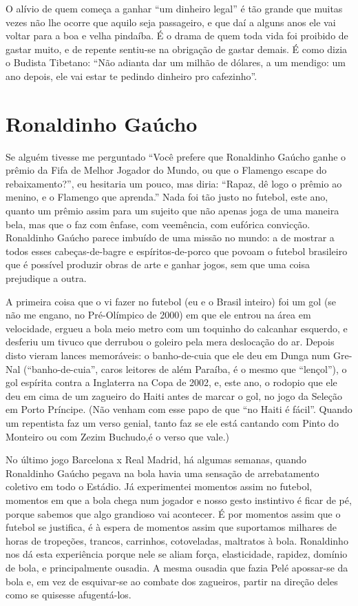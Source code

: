 O alívio de quem começa a ganhar “um dinheiro legal” é tão grande que
muitas vezes não lhe ocorre que aquilo seja passageiro, e que daí a
alguns anos ele vai voltar para a boa e velha pindaíba. É o drama de
quem toda vida foi proibido de gastar muito, e de repente sentiu-se
na obrigação de gastar demais. É como dizia o Budista Tibetano: “Não
adianta dar um milhão de dólares, a um mendigo: um ano depois, ele
vai estar te pedindo dinheiro pro cafezinho”.

\chapter{Ronaldinho Gaúcho}

Se alguém tivesse me perguntado “Você prefere que Ronaldinho Gaúcho
ganhe o prêmio da Fifa de Melhor Jogador do Mundo, ou que o Flamengo
escape do rebaixamento?”, eu hesitaria um pouco, mas diria: “Rapaz,
dê logo o prêmio ao menino, e o Flamengo que aprenda.”  Nada foi tão
justo no futebol, este ano, quanto um prêmio assim para um sujeito
que não apenas joga de uma maneira bela, mas que o faz com ênfase,
com veemência, com eufórica convicção. Ronaldinho Gaúcho parece
imbuído de uma missão no mundo: a de mostrar a todos esses
cabeças-de-bagre e espíritos-de-porco que povoam o futebol brasileiro
que é possível produzir obras de arte e ganhar jogos, sem que uma
coisa prejudique a outra.

A primeira coisa que o vi fazer no futebol (eu e o Brasil inteiro) foi
um gol (se não me engano, no Pré-Olímpico de 2000) em que ele entrou
na área em velocidade, ergueu a bola meio metro com um toquinho do
calcanhar esquerdo, e desferiu um tivuco que derrubou o goleiro pela
mera deslocação do ar.  Depois disto vieram lances memoráveis: o
banho-de-cuia que ele deu em Dunga num Gre-Nal (“banho-de-cuia”,
caros leitores de além Paraíba, é o mesmo que “lençol”), o gol
espírita contra a Inglaterra na Copa de 2002, e, este ano, o rodopio
que ele deu em cima de um zagueiro do Haiti antes de marcar o gol, no
jogo da Seleção em Porto Príncipe. (Não venham com esse papo de que
“no Haiti é fácil”. Quando um repentista faz um verso genial, tanto
faz se ele está cantando com Pinto do Monteiro ou com Zezim Buchudo,é
o verso que vale.)

No último jogo Barcelona x Real Madrid, há algumas semanas, quando
Ronaldinho Gaúcho pegava na bola havia uma sensação de arrebatamento
coletivo em todo o Estádio. Já experimentei momentos assim no
futebol, momentos em que a bola chega num jogador e nosso gesto
instintivo é ficar de pé, porque sabemos que algo grandioso vai
acontecer.  É por momentos assim que o futebol se justifica, é à
espera de momentos assim que suportamos milhares de horas de
tropeções, trancos, carrinhos, cotoveladas, maltratos à bola. 
Ronaldinho nos dá esta experiência porque nele se aliam força,
elasticidade, rapidez, domínio de bola, e principalmente ousadia. A
mesma ousadia que fazia Pelé apossar-se da bola e, em vez de
esquivar-se ao combate dos zagueiros, partir na direção deles como se
quisesse afugentá-los.

